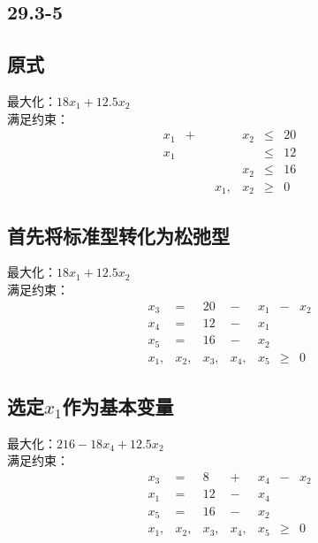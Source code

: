 \documentclass[twocolumn]{article}
\newenvironment{SChinese}{%
	\CJKfamily{gbsn}%
	\CJKtilde
	\CJKnospace}{}
\begin{document}
\begin{CJK}{UTF8}{}
\begin{SChinese}
			\section*{29.3-5}
				\subsection*{原式}
				最大化：$18x_1+12.5x_2$\\
				满足约束：\begin{displaymath}
				\begin{matrix}
				x_1 & + &  &  & x_2 & \le & 20 \\
				x_1 &   &  &  &     & \le & 12 \\
				    &   &  &  & x_2 & \le & 16 \\
				    &   &  & x_1, & x_2 & \ge & 0 
				\end{matrix}
				\end{displaymath}
				\subsection*{首先将标准型转化为松弛型}
				最大化：$18x_1+12.5x_2$\\
				满足约束：\begin{displaymath}
				\begin{matrix}
				x_3 & = & 20 & - & x_1 & - & x_2 \\
				x_4 & = & 12 & - & x_1 &   &     \\
				x_5 & = & 16 & - & x_2 &   &     \\
				x_1, & x_2, & x_3, & x_4, & x_5 & \ge & 0
				\end{matrix}
				\end{displaymath}
				\subsection*{选定$x_1$作为基本变量}
				最大化：$216-18x_4+12.5x_2$\\
				满足约束：\begin{displaymath}
				\begin{matrix}
				x_3 & = & 8 & + & x_4 & - & x_2 \\
				x_1 & = & 12 & - & x_4 &   &     \\
				x_5 & = & 16 & - & x_2 &   &     \\
				x_1, & x_2, & x_3, & x_4, & x_5 & \ge & 0
				\end{matrix}
				\end{displaymath}

\end{SChinese}
\end{CJK}
\end{document}
